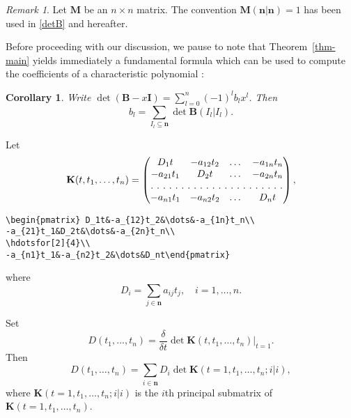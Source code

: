 \documentclass[draft]{amsart}
\newtheorem{cor}[thm]{Corollary}
\theoremstyle{definition}
\theoremstyle{remark}
\newtheorem{rem}{Remark}[section]
\newcommand{\thmref}[1]{Theorem~\ref{#1}}
\begin{document}
\begin{rem}
Let $\mathbf{M}$ be an $n\times n$ matrix. The convention
$\mathbf{M}(\mathbf{n}|\mathbf{n})=1$ has been used in \eqref{detB} and hereafter.
\end{rem}

Before proceeding with our discussion, we pause to note that
\thmref{thm-main} yields immediately a fundamental formula which can be
used to compute the coefficients of a characteristic polynomial
\cite{mami:matrixth}:
\begin{cor}\label{BI}
Write $\det(\mathbf{B}-x\mathbf{I})=\sum^n_{l =0}(-1)
^l b_l x^l $. Then
\begin{equation}\label{bl-sum}
b_l =\sum_{I_l \subseteq\mathbf{n}}\det\mathbf{B}(I_l |I_l ).
\end{equation}
\end{cor}
Let
\begin{equation}
\mathbf{K}(t,t_1,\dots,t_n)=\begin{pmatrix} D_1t&-a_{12}t_2&\dots&-a_{1n}t_n\\
-a_{21}t_1&D_2t&\dots&-a_{2n}t_n\\
\hdotsfor[2]{4}\\
-a_{n1}t_1&-a_{n2}t_2&\dots&D_nt\end{pmatrix},
\end{equation}
\begin{verbatim}
\begin{pmatrix} D_1t&-a_{12}t_2&\dots&-a_{1n}t_n\\
-a_{21}t_1&D_2t&\dots&-a_{2n}t_n\\
\hdotsfor[2]{4}\\
-a_{n1}t_1&-a_{n2}t_2&\dots&D_nt\end{pmatrix}
\end{verbatim}
where
\begin{equation}
D_i=\sum_{j\in\mathbf{n}}a_{ij}t_j,\quad i=1,\dots,n.
\end{equation}

Set
\begin{equation*}
D(t_1,\dots,t_n)=\frac{\delta}{\delta t}\det\mathbf{K}(t,t_1,\dots,t_n)
|_{t=1}.
\end{equation*}
Then
\begin{equation}\label{sum-Di}
D(t_1,\dots,t_n)=\sum_{i\in\mathbf{n}}D_i\det\mathbf{K}(t=1,t_1,\dots,t_n;
i|i),
\end{equation}
where $\mathbf{K}(t=1,t_1,\dots,t_n; i|i)$ is the $i$th principal
submatrix of $\mathbf{K}(t=1,t_1,\dots,t_n)$.
\end{document}
